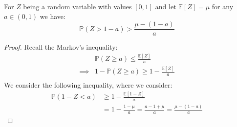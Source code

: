 \begin{lemma}
    For $Z$ being a random variable with values $[0, 1]$ and let $\mathbb{E}[Z] = \mu$ for any $a\in(0, 1)$ we have:
    \begin{equation*}
        \mathbb{P}(Z > 1-a) > \frac{\mu - (1-a)}{a}
    \end{equation*}
\end{lemma}
\begin{proof}
    Recall the Markov's inequality:
    \begin{equation*}
    \begin{aligned}
        &\mathbb{P}(Z\ge a) \le \frac{\mathbb{E}[Z]}{a} \\
        \implies&1 - \mathbb{P}(Z\ge a) \ge 1-  \frac{\mathbb{E}[Z]}{a} \\
    \end{aligned}
    \end{equation*}
    We consider the following inequality, where we consider:
    \begin{equation*}
    \begin{aligned}
        \mathbb{P}(1 - Z < a) &\ge 1- \frac{\mathbb{E}[1-Z]}{a} \\
        &= 1 - \frac{1-\mu}{a} = \frac{a-1+\mu}{a} = \frac{\mu - (1-a)}{a}
    \end{aligned}
    \end{equation*}
\end{proof}

